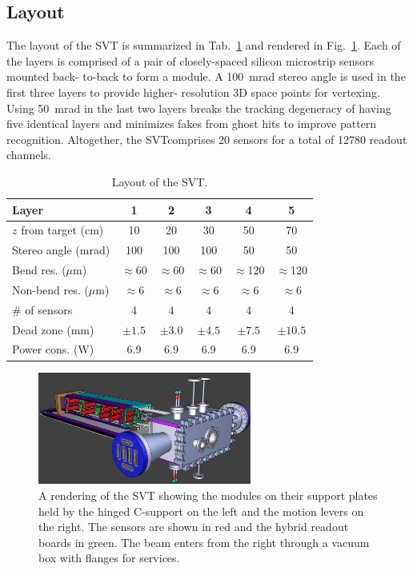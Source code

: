 \documentclass[final,3p,times,twocolumn]{elsarticle}
\begin{document}
\subsection{Layout}
The layout of the SVT is summarized in Tab.~\ref{tab:trk} and rendered in Fig.~\ref{fig:tracker_model}. 
Each of the layers is comprised of a pair of closely-spaced silicon microstrip sensors mounted back-
to-back to form a module. A 100~mrad stereo angle is used in the first three layers to provide higher-
resolution 3D space points for vertexing.  Using 50~mrad in the last two layers breaks the tracking 
degeneracy of having five identical layers and minimizes fakes from ghost hits to improve pattern 
recognition. Altogether, the SVTcomprises 20 sensors for a total of 12780 readout channels. 
\begin{center}
\begin{table}[ht]
{\footnotesize
\begin{tabular}{lccccc}   
\hline \hline 
    Layer & 1 & 2 & 3 & 4 & 5 \\      
\hline
    $z$ from target (cm)  & 10 & 20 & 30 & 50 & 70  \\ 
    Stereo angle (mrad)  & 100 & 100 & 100 & 50 & 50 \\ 
    Bend res. ($\mu$m)  & $\approx$60 & $\approx$60 & $\approx$60 & $\approx$120 & $\approx$120  \\ 
    Non-bend res. ($\mu$m)  & $\approx$6 & $\approx$6 & $\approx$6 & $\approx$6 & $\approx$6  \\ 
    \# of sensors  & 4 & 4 & 4 & 4 & 4  \\ 
    Dead zone (mm) & $\pm1.5$  & $\pm3.0$  & $\pm4.5$  & $\pm7.5$  & $\pm10.5$  \\ 
    Power cons. (W) & 6.9 & 6.9 & 6.9 & 6.9 & 6.9 \\
\hline \hline
\end{tabular}
\caption{\small Layout of the SVT.}
}
\label{tab:trk}
\vspace*{-15mm}
\end{table}
\end{center}
\begin{center}
\begin{figure}[htp]
\includegraphics[width=7cm]{figures/HPS_nochamber}
\caption{\small A rendering of the SVT showing the modules on their support plates held by the 
hinged C-support on the left and the motion levers on the right. The sensors are shown in red and the 
hybrid readout boards in green. The beam enters from the right through a vacuum box with flanges 
for services. }
\label{fig:tracker_model}
\end{figure}
\end{center}
\end{document}
